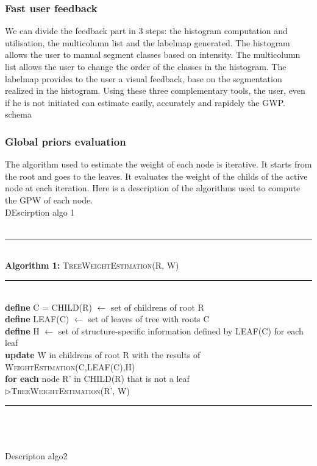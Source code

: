 \subsubsection{Fast user feedback}
We can divide the feedback part in 3 steps: the histogram computation and utilisation, the multicolumn list and the labelmap generated.
The histogram allows the user to manual segment classes based on intensity.
The multicolumn list allows the user to change the order of the classes in the histogram.
The labelmap provides to the user a visual feedback, base on the segmentation realized in the histogram.
Using these three complementary tools, the user, even if he is not initiated can estimate easily, accurately and rapidely the GWP.
\\schema
\subsubsection{Global priors evaluation}
The algorithm used to estimate the weight of each node is iterative. It starts from the root and goes to the leaves. It evaluates the weight of the childs of the active node at each iteration. Here is a description of the algorithms used to compute the GPW of each node.\\
DEscirption algo 1\\\\
%
%
\begin{minipage}{1\textwidth}
%
\hrule
\textbf{\\Algorithm 1:} \textsc{TreeWeightEstimation}(R, W)
\hrule
\textbf{\\define}  C = CHILD(R) $\leftarrow$ set of childrens of root R\\ 
\textbf{define}  LEAF(C)      $\leftarrow$ set of leaves of tree with roots C\\ 
\textbf{define}  H            $\leftarrow$ set of structure-specific information defined by LEAF(C) for each leaf\\
%
\textbf{update} W in childrens of root R with the results of \textsc{WeightEstimation}(C,LEAF(C),H)\\
%
\textbf{for each} node R' in CHILD(R) that is not a leaf\\
%
$\triangleright$\textsc{TreeWeightEstimation}(R', W)\\
\hrule
%
\end{minipage}
%
\\\\\\Descripton algo2\\
